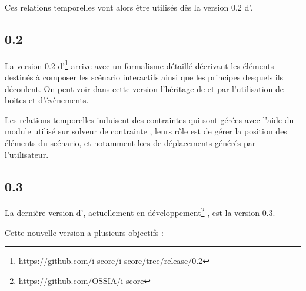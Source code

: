 Ces relations temporelles vont alors être utilisés dès la version 0.2 d'\iscore{}.

\subsection{\iscore{} 0.2}

La version 0.2 d'\iscore{}\footnote{\url{https://github.com/i-score/i-score/tree/release/0.2}} arrive avec un formalisme détaillé\cite{hogue2014ossia} décrivant les éléments destinés à composer les scénario interactifs ainsi que les principes desquels ils découlent. On peut voir  dans cette version l'héritage de \boxes{} et \openmusic{} par l'utilisation de boites et d'évènements.


Les relations temporelles induisent des contraintes qui sont gérées avec l'aide du module \csp{} utilisé sur \boxes{}
solveur de contrainte \gecode{}, leurs rôle est de gérer la position des éléments du scénario, et notamment lors de déplacements générés par l'utilisateur. 


\subsection{\iscore{} 0.3}%

La dernière version d'\iscore{}, actuellement en développement\footnote{\url{https://github.com/OSSIA/i-score}} \iscore{}, est la version 0.3.

Cette nouvelle version a plusieurs objectifs :

